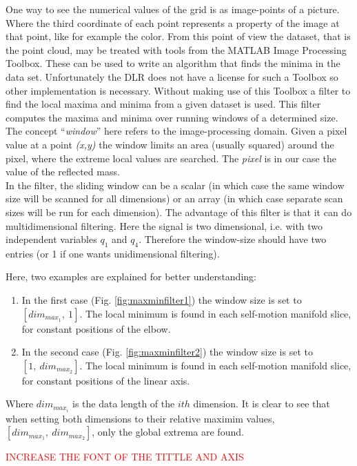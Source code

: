%
One way to see the numerical values of the grid is as image-points of a picture. Where the third coordinate of each point represents a property of the image at that point, like for example the color. From this point of view the dataset, that is the point cloud, may be treated with tools from the MATLAB Image Processing Toolbox. These can be used to write an algorithm that finds the minima in the data set. Unfortunately the DLR does not have a license for such a Toolbox so other implementation is necessary.
Without making use of this Toolbox a filter \cite{minmaxfilter} to find the local maxima and minima from a given dataset is used. This filter computes the maxima and minima over running windows of a determined size. The concept “\textit{window}” here refers to the image-processing domain. Given a pixel value at a point \textit{(x,y)} the window limits an area (usually squared) around the pixel, where the extreme local values are searched. The \textit{pixel} is in our case  the value of the reflected mass.\\
%
In the filter, the sliding window can be a scalar (in which case the same window size will be scanned for all dimensions) or an array (in which case separate scan sizes will be run for each dimension). The advantage of this filter is that it can do multidimensional filtering. Here the signal is two dimensional, i.e. with two independent variables $q_1$ and $q_4$. Therefore the window-size should have two entries (or 1 if one wants unidimensional filtering).


Here, two examples are explained for better understanding:
\begin{enumerate}
	\item In the first case (Fig. \ref{fig:maxminfilter1}) the window size is set to $[dim_{max_{1}}, \ 1]$. The local minimum is found in each self-motion manifold slice, for constant positions of the elbow.
	\item In the second case (Fig. \ref{fig:maxminfilter2}) the window size is set to $[1, \ dim_{max_{2}}]$. The local minimum is found in each self-motion manifold slice, for constant positions of the linear axis.
	
\end{enumerate}

Where $dim_{max_{i}}$ is the data length of the $ith$ dimension. It is clear to see that when setting both dimensions to their relative maximim values, $[dim_{max_{1}}, \ dim_{max_{2}}]$, only the global extrema are found.

\textcolor{red}{INCREASE THE FONT OF THE TITTLE AND AXIS}

